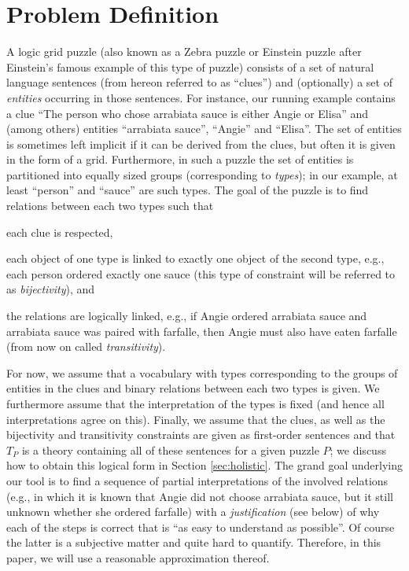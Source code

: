 \documentclass{ecai}
\begin{document}
\section{Problem Definition}
A logic grid puzzle  (also known as a Zebra puzzle or Einstein puzzle after Einstein's famous example of this type of puzzle) consists of a set of natural language sentences (from hereon referred to as ``clues'') and (optionally) a set of \emph{entities} occurring in those sentences. 
For instance, our running example contains a clue ``The person who chose arrabiata sauce is either Angie or Elisa'' and (among others) entities ``arrabiata sauce'', ``Angie'' and ``Elisa''. 
The set of entities is sometimes left implicit if it can be derived from the clues, but often it is given in the form of a grid. 
Furthermore, in such a puzzle the set of entities is partitioned into equally sized groups (corresponding to \emph{types}); in our example, at least ``person'' and ``sauce'' are such types. 
The goal of the puzzle is to find relations between each two types such that
\begin{compactitem}
\item each clue is respected, 
\item each object of one type is linked to exactly one object of the second type, e.g., each person ordered exactly one sauce (this type of constraint will be referred to as \emph{bijectivity}), and 
\item the relations are logically linked, e.g., if Angie ordered arrabiata sauce and arrabiata sauce was paired with farfalle, then Angie must also have eaten farfalle (from now on called \emph{transitivity}). 
\end{compactitem}

For now, we assume that a vocabulary with types corresponding to the groups of entities in the clues and binary relations between each two types is given.
We furthermore assume that the interpretation of the types is fixed (and hence all interpretations agree on this). 
Finally, we assume that the clues, as well as the bijectivity and transitivity constraints are given as first-order sentences and that $T_P$ is a theory containing all of these sentences for a given puzzle $P$; we discuss how to obtain this logical form in Section \ref{sec:holistic}. 
The grand goal underlying our tool is to find a sequence of partial interpretations of the involved relations (e.g., in which it is known that Angie did not choose arrabiata sauce, but it still unknown whether she ordered farfalle) with a 
\emph{justification} (see below) of why each of the steps is correct that is ``as easy to understand as possible''. 
Of course the latter is a subjective matter and quite hard to quantify. Therefore, in this paper, we will use a reasonable approximation thereof. 
\end{document}
